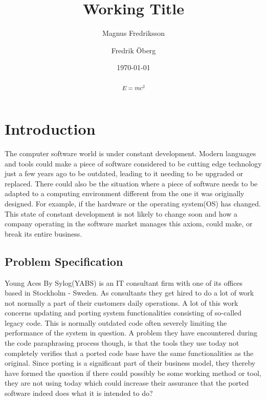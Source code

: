 \documentclass{article}
\begin{document}
\title{Working Title}
\author{Magnus Fredriksson}
\author{Fredrik Öberg}
\date{\today}
\maketitle

\begin{abstract}





\begin{displaymath} 
	E = {mc^2} 
\end{displaymath}




\end{abstract}

\newpage
\tableofcontents
\newpage
\section{Introduction}\label{introduction}

The computer software world is under constant development. Modern languages and tools could make a piece of software considered to be cutting edge technology just a few years ago to be outdated, leading to it needing to be upgraded or replaced. There could also be the situation where a piece of software needs to be adapted to a computing environment different from the one it was originally designed. For example, if the hardware or the operating system(OS) has changed. This state of constant development is not likely to change soon and how a company operating in the software market manages this axiom, could make, or break its entire business.
\subsection{Problem Specification}
Young Aces By Sylog(YABS) is an IT consultant firm with one of its offices based in Stockholm - Sweden. As consultants they get hired to do a lot of work not normally a part of their customers daily operations. A lot of this work concerns updating and porting system functionalities consisting of so-called legacy code. This is normally outdated code often severely limiting the performance of the system in question. A problem they have encountered during the code paraphrasing process though, is that the tools they use today not completely verifies that a ported code base have the same functionalities as the original. Since porting is a significant part of their business model, they thereby have formed the question if there could possibly be some working method or tool, they are not using today which could increase their assurance that the ported software indeed does what it is intended to do?
\end{document}
